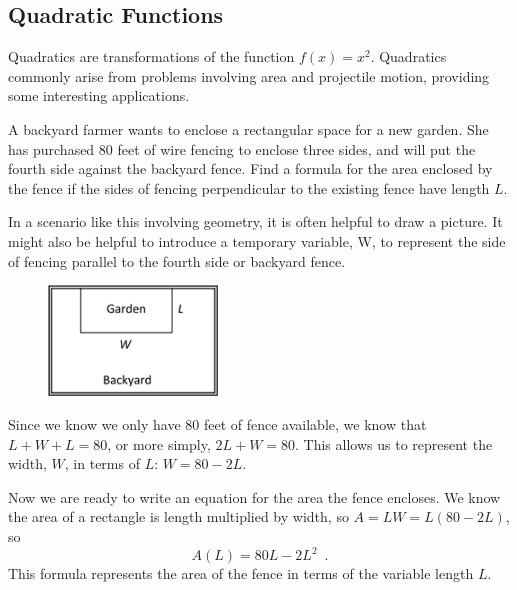 \subsection{Quadratic Functions}
\label{ssec:quadratic}

Quadratics are transformations of the function $f(x)=x^2$. Quadratics commonly arise from problems involving area and projectile motion, providing some interesting applications.

\begin{example}
A backyard farmer wants to enclose a rectangular space for a new garden. She has purchased 80 feet of wire fencing to enclose three sides, and will put the fourth side against the backyard fence. Find a formula for the area enclosed by the fence if the sides of fencing perpendicular to the existing fence have length $L$.

\begin{solution} In a scenario like this involving geometry, it is often helpful to draw a picture. It might also be helpful to introduce a temporary variable, W, to represent the side of fencing parallel to the fourth side or backyard fence.
	\begin{figure}[!ht]
	\centering
	\includegraphics[width=0.4\textwidth]{img/chap1/sec1-5/image096.png}
	\caption{}
	\end{figure}
Since we know we only have 80 feet of fence available, we know that $L+W+L=80$, or more simply, $2L+W=80$. This allows us to represent the width, $W$, in terms of $L$: $W=80-2L$.

Now we are ready to write an equation for the area the fence encloses. We know the area of a rectangle is length multiplied by width, so $A=LW=L(80-2L)$, so
$$A(L)=80L-2L^2 \enspace .$$
This formula represents the area of the fence in terms of the variable length $L$.
\end{solution}\end{example}

